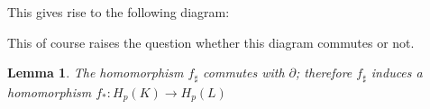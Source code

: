 \documentclass[draft,toc=bib]{scrartcl}
\theoremstyle{plain}
\newtheorem{lemma}[theorem]{Lemma}
\theoremstyle{definition}
\theoremstyle{remark}
\begin{document}
This gives rise to the following diagram:

\begin{center}
	
\end{center}

This of course raises the question whether this diagram commutes or not. 
\begin{lemma}
	The homomorphism $f_\sharp$ commutes with $\partial$; therefore $f_\sharp$ induces a homomorphism $f_\ast:H_p(K)\to H_p(L)$
\end{lemma}
\end{document}
